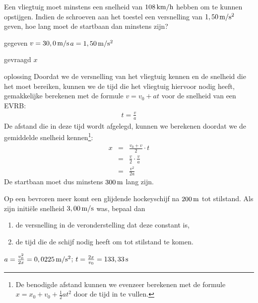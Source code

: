 \begin{exercise} Een vliegtuig moet minstens een snelheid van $108\rm\,km/h$ hebben om te kunnen opstijgen. Indien de schroeven aan het toestel een versnelling van $1,50\rm\,m/s^2$ geven, hoe lang moet de startbaan dan minstens zijn? 
\begin{oplossing}
\item[gegeven]$v=30,0\rm\,m/s$\newline$a=1,50\rm\,m/s^2$
\item[gevraagd]$x$
\item[oplossing]Doordat we de versnelling van het vliegtuig kennen en de snelheid die het moet bereiken, kunnen we de tijd die het vliegtuig hiervoor nodig heeft, gemakkelijke berekenen met de formule $v=v_0+at$ voor de snelheid van een EVRB:
\begin{eqnarray*}
t=\frac{v}{a}
\end{eqnarray*}
De afstand die in deze tijd wordt afgelegd, kunnen we berekenen doordat we de gemiddelde snelheid kennen\footnote{De benodigde afstand kunnen we evenzeer berekenen met de formule $x=x_0+v_0+\frac{1}{2}at^2$ door de tijd in te vullen.}:
\begin{eqnarray*}
x&=&\frac{v_0+v}{2}\cdot t\\
&=&\frac{v}{2}\cdot\frac{v}{a}\\
&=&\frac{v^2}{2a}
\end{eqnarray*}
De startbaan moet dus minstens $300\rm\,m$ lang zijn.
\end{oplossing}

\end{exercise}

\begin{exercise} Op een bevroren meer komt een glijdende hockeyschijf na $200\rm\,m$ tot stilstand. Als zijn initi\"ele snelheid $3,00\rm\,m/s$ was, bepaal dan
\begin{enumerate}
\item de versnelling in de veronderstelling dat deze constant is,
\item de tijd die de schijf nodig heeft om tot stilstand te komen.
\end{enumerate}
\begin{oplossing}
	$a=\frac{v_0^2}{2x}=0,0225\rm\,m/s^2$; $t=\frac{2x}{v_0}=133,33\rm\,s$
\end{oplossing}

\end{exercise}

